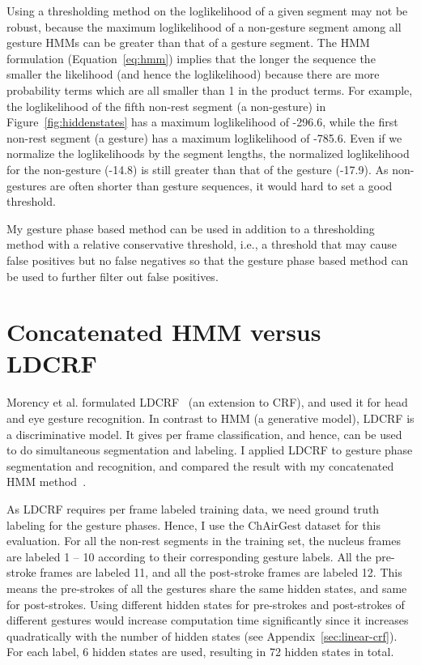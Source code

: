 Using a thresholding method on the loglikelihood of a
given segment may not be robust, because the maximum loglikelihood of a
non-gesture segment among all gesture HMMs can be greater than that of a gesture segment.
The HMM formulation (Equation~\ref{eq:hmm}) implies that the longer the sequence the smaller the
likelihood (and hence the loglikelihood) because there are more probability
terms which are all smaller than 1 in the product terms. For example, the
loglikelihood of the fifth non-rest segment (a non-gesture) in
Figure~\ref{fig:hiddenstates} has a maximum loglikelihood of -296.6, while the
first non-rest segment (a gesture) has a maximum loglikelihood of -785.6. 
Even if we normalize the loglikelihoods by the segment lengths, the normalized
loglikelihood for the non-gesture (-14.8) is still greater than that of the
gesture (-17.9). As non-gestures are often shorter than gesture sequences, it
would hard to set a good threshold.
 
My gesture phase based method can be used in addition to a thresholding method
with a relative conservative threshold, i.e., a threshold that may cause false
positives but no false negatives so that the gesture phase based method can be used to further
filter out false positives.

\section{Concatenated HMM versus LDCRF}
Morency et al. formulated LDCRF~\cite{morency07} (an extension to CRF), and used
it for head and eye gesture recognition. In contrast to HMM (a
generative model), LDCRF is a discriminative model. It gives
per frame classification, and hence, can 
be used to do simultaneous segmentation and labeling. I applied LDCRF to gesture phase segmentation and recognition, and
compared the result with my concatenated HMM method~\cite{yin13}. 

As LDCRF requires per frame labeled training data, we need ground truth labeling
for the gesture phases. Hence, I use the ChAirGest dataset for this
evaluation. For all the non-rest segments in the training set, the nucleus
frames are labeled 1 -- 10 according to their corresponding gesture labels.
All the pre-stroke frames are labeled 11, and all the post-stroke
frames are labeled 12. This means the pre-strokes of all the gestures share the
same hidden states, and same for post-strokes. Using different hidden states
for pre-strokes and post-strokes of different gestures would increase
computation time significantly since it increases quadratically with the number
of hidden states (see Appendix~\ref{sec:linear-crf}). For each label, 6 hidden
states are used, resulting in 72 hidden states in total.

